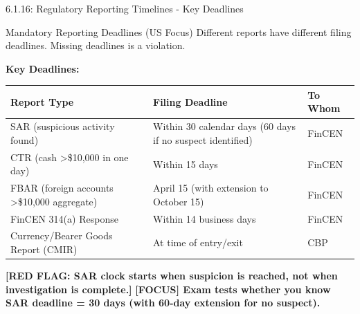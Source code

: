 \documentclass[11pt,a4paper]{beamer}
\newcommand{\examfocus}[1]{\textcolor{orange!80!black}{\textbf{[FOCUS] #1}}}
\newcommand{\redflag}[1]{\textcolor{red!80!black}{\textbf{[RED FLAG: #1]}}}
\begin{document}
\begin{frame}{6.1.16: Regulatory Reporting Timelines - Key Deadlines}
	\begin{block}{Mandatory Reporting Deadlines (US Focus)}
		Different reports have different filing deadlines. Missing deadlines is a violation.
	\end{block}
	\textbf{Key Deadlines:}
	\begin{tabular}{p{}|p{}|p{}}
		\hline
		\rowcolor{lightgray}
		\textbf{Report Type} & \textbf{Filing Deadline} & \textbf{To Whom} \\
		\hline
		SAR (suspicious activity found) & Within 30 calendar days (60 days if no suspect identified) & FinCEN \\
		\hline
		CTR (cash >\$10,000 in one day) & Within 15 days & FinCEN \\
		\hline
		FBAR (foreign accounts >\$10,000 aggregate) & April 15 (with extension to October 15) & FinCEN \\
		\hline
		FinCEN 314(a) Response & Within 14 business days & FinCEN \\
		\hline
		Currency/Bearer Goods Report (CMIR) & At time of entry/exit & CBP \\
		\hline
	\end{tabular}
	\vspace{0.2cm}
	\redflag{SAR clock starts when suspicion is reached, not when investigation is complete.}
	\examfocus{Exam tests whether you know SAR deadline = 30 days (with 60-day extension for no suspect).}
\end{frame}

\end{document}

